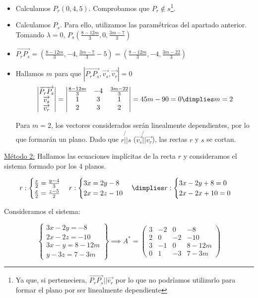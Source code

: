 \documentclass[palatino,nosec,nochap,nobuilddate]{Docencia}
\renewcommand{\vec}[1]{\overrightarrow{#1}}
\begin{document}
\begin{problem}
\begin{itemize}
	\item Calculamos $P_r(0,4,5)$. Comprobamos que $P_r\not\in s$\footnote{Ya que, si perteneciera, $\vec{P_rP_s} || \vec{v_r}$ por lo que no podríamos utilizarlo para formar el plano por ser linealmente dependiente}.
	\item Calculamos $P_s$. Para ello, utilizamos las paramétricas del apartado anterior.
	\subitem Tomando $\lambda=0$, $P_s\left(\frac{8-12m}{3},0,\frac{3m-7}{3}\right)$
	\item $\vec{P_rP_s} = \left(\frac{8-12m}{3},-4,\frac{3m-7}{3}-5\right) = \left(\frac{8-12m}{3},-4,\frac{3m-22}{3}\right)$
	\item Hallamos $m$ para que $|\vec{P_rP_s},\vec{v_s},\vec{v_r}| = 0$
\[
\left|
\begin{matrix}
\vec{P_rP_s}\\
\vec{v_s}\\
\vec{v_r}
\end{matrix}
\right| =
\left|
\begin{matrix}
\frac{8-12m}{3}&-4&\frac{3m-22}{3}\\
1&3&1\\
2&3&2\\
\end{matrix}
\right| = 45m-90 = 0\dimplies m=2
\]

Para $m=2$, los vectores considerados serán linealmente dependientes, por lo que formarán un plano. Dado que $r\not{||}s$ ($\vec{v_s}\not{||}\vec{v_r}$), las rectas $r$ y $s$ se cortan.

\end{itemize}

\ul{Método 2:} Hallamos las ecuaciones implícitas de la recta $r$ y consideramos el sistema formado por los 4 planos.

\[
r: \begin{cases} \frac{x}{2} = \frac{y-4}{3}\\\frac{x}{2} = \frac{z-5}{2}\end{cases}r:\begin{cases}3x = 2y-8 \\ 2x = 2z-10\end{cases} \dimplies r:\begin{cases}3x-2y+8=0\\2x-2x+10=0\end{cases}
\]

Consideramos el sistema: 

\[
\left\{\begin{array}{c}
3x-2y=-8\\
2x-2z=-10\\
3x-y=8-12m\\
y-3z = 7-3m
\end{array}
\right\} \implies A^* = \begin{pmatrix}
3&-2&0&-8\\
2&0&-2&-10\\
3&-1&0&8-12m\\
0&1&-3&7-3m
\end{pmatrix}
\]


\end{problem}
\end{document}
